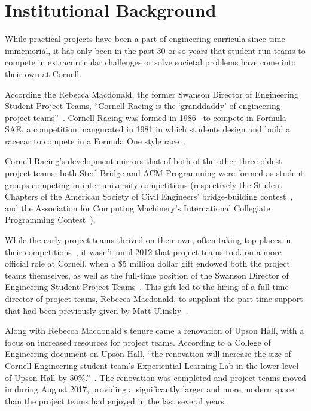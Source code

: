 \documentclass[12pt]{article}
\begin{document}
\section{Institutional Background}
\label{sec:background}
While practical projects have been a part of engineering curricula since time immemorial, it has only been in the past 30 or so years that student-run teams to compete in extracurricular challenges or solve societal problems have come into their own at Cornell.

According the Rebecca Macdonald, the former Swanson Director of Engineering Student Project Teams, ``Cornell Racing is the `granddaddy' of engineering project teams''~\cite{klein_engineering_2015}. Cornell Racing was formed in 1986~\cite{noauthor_cornell_2012} to compete in Formula SAE, a competition inaugurated in 1981 in which students design and build a racecar to compete in a Formula One style race~\cite{sae_international_formula_2018}.

Cornell Racing's development mirrors that of both of the other three oldest project teams: both Steel Bridge and ACM Programming were formed as student groups competing in inter-university competitions (respectively the Student Chapters of the American Society of Civil Engineers' bridge-building contest~\cite{robert_e._shaw_jr._bridging_1988}, and the Association for Computing Machinery's International Collegiate Programming Contest~\cite{poucher_early_2011}).

While the early project teams thrived on their own, often taking top places in their competitions~\cite{noauthor_cuauv_2003}, it wasn't until 2012 that project teams took on a more official role at Cornell, when a \$5 million dollar gift endowed both the project teams themselves, as well as the full-time position of the Swanson Director of Engineering Student Project Teams~\cite{emily_hopkins_10_2012}.
This gift led to the hiring of a full-time director of project teams, Rebecca Macdonald, to supplant the part-time support that had been previously given by Matt Ulinsky~\cite{thomas_putting_2013}.

Along with Rebecca Macdonald's tenure came a renovation of Upson Hall, with a focus on increased resources for project teams.
According to a College of Engineering document on Upson Hall, ``the renovation will increase the size of Cornell Engineering student team's Experiential Learning Lab in the lower level of Upson Hall by 50\%.''~\cite{noauthor_cornell_2015-1}.
The renovation was completed and project teams moved in during August 2017, providing a significantly larger and more modern space than the project teams had enjoyed in the last several years.
\end{document}

